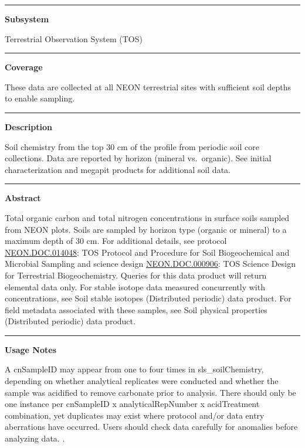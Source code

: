 \documentclass[]{article}
\begin{document}
\begin{center}\rule{0.5\linewidth}{\linethickness}\end{center}

\textbf{Subsystem}

Terrestrial Observation System (TOS)

\begin{center}\rule{0.5\linewidth}{\linethickness}\end{center}

\textbf{Coverage}

These data are collected at all NEON terrestrial sites with sufficient
soil depths to enable sampling.

\begin{center}\rule{0.5\linewidth}{\linethickness}\end{center}

\textbf{Description}

Soil chemistry from the top 30 cm of the profile from periodic soil core
collections. Data are reported by horizon (mineral vs.~organic). See
initial characterization and megapit products for additional soil data.

\begin{center}\rule{0.5\linewidth}{\linethickness}\end{center}

\textbf{Abstract}

Total organic carbon and total nitrogen concentrations in surface soils
sampled from NEON plots. Soils are sampled by horizon type (organic or
mineral) to a maximum depth of 30 cm. For additional details, see
protocol
\href{http://data.neonscience.org/api/v0/documents/NEON.DOC.014048vG}{NEON.DOC.014048}:
TOS Protocol and Procedure for Soil Biogeochemical and Microbial
Sampling and science design
\href{http://data.neonscience.org/api/v0/documents/NEON.DOC.000906vA}{NEON.DOC.000906}:
TOS Science Design for Terrestrial Biogeochemistry. Queries for this
data product will return elemental data only. For stable isotope data
measured concurrently with concentrations, see Soil stable isotopes
(Distributed periodic) data product. For field metadata associated with
these samples, see Soil physical properties (Distributed periodic) data
product.

\begin{center}\rule{0.5\linewidth}{\linethickness}\end{center}

\textbf{Usage Notes}

A cnSampleID may appear from one to four times in sls\_soilChemistry,
depending on whether analytical replicates were conducted and whether
the sample was acidified to remove carbonate prior to analysis. There
should only be one instance per cnSampleID x analyticalRepNumber x
acidTreatment combination, yet duplicates may exist where protocol
and/or data entry aberrations have occurred. Users should check data
carefully for anomalies before analyzing data. \newpage
.
\end{document}
